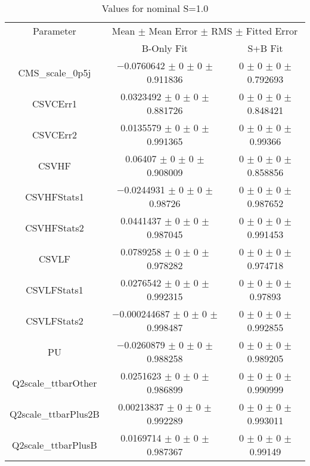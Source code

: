 \begin{table}
\centering
\caption{Values for nominal S=1.0}
\begin{tabular}{ccc}
\toprule
Parameter & \multicolumn{2}{c}{Mean $\pm$ Mean Error $\pm$ RMS $\pm$ Fitted Error}\\
 & B-Only Fit & S+B Fit\\
\midrule
CMS\_scale\_0p5j & \num{-0.0760642} $\pm$ \num{0} $\pm$ \num{0} $\pm$ \num{0.911836} & \num{0} $\pm$ \num{0} $\pm$ \num{0} $\pm$ \num{0.792693}\\
CSVCErr1 & \num{0.0323492} $\pm$ \num{0} $\pm$ \num{0} $\pm$ \num{0.881726} & \num{0} $\pm$ \num{0} $\pm$ \num{0} $\pm$ \num{0.848421}\\
CSVCErr2 & \num{0.0135579} $\pm$ \num{0} $\pm$ \num{0} $\pm$ \num{0.991365} & \num{0} $\pm$ \num{0} $\pm$ \num{0} $\pm$ \num{0.99366}\\
CSVHF & \num{0.06407} $\pm$ \num{0} $\pm$ \num{0} $\pm$ \num{0.908009} & \num{0} $\pm$ \num{0} $\pm$ \num{0} $\pm$ \num{0.858856}\\
CSVHFStats1 & \num{-0.0244931} $\pm$ \num{0} $\pm$ \num{0} $\pm$ \num{0.98726} & \num{0} $\pm$ \num{0} $\pm$ \num{0} $\pm$ \num{0.987652}\\
CSVHFStats2 & \num{0.0441437} $\pm$ \num{0} $\pm$ \num{0} $\pm$ \num{0.987045} & \num{0} $\pm$ \num{0} $\pm$ \num{0} $\pm$ \num{0.991453}\\
CSVLF & \num{0.0789258} $\pm$ \num{0} $\pm$ \num{0} $\pm$ \num{0.978282} & \num{0} $\pm$ \num{0} $\pm$ \num{0} $\pm$ \num{0.974718}\\
CSVLFStats1 & \num{0.0276542} $\pm$ \num{0} $\pm$ \num{0} $\pm$ \num{0.992315} & \num{0} $\pm$ \num{0} $\pm$ \num{0} $\pm$ \num{0.97893}\\
CSVLFStats2 & \num{-0.000244687} $\pm$ \num{0} $\pm$ \num{0} $\pm$ \num{0.998487} & \num{0} $\pm$ \num{0} $\pm$ \num{0} $\pm$ \num{0.992855}\\
PU & \num{-0.0260879} $\pm$ \num{0} $\pm$ \num{0} $\pm$ \num{0.988258} & \num{0} $\pm$ \num{0} $\pm$ \num{0} $\pm$ \num{0.989205}\\
Q2scale\_ttbarOther & \num{0.0251623} $\pm$ \num{0} $\pm$ \num{0} $\pm$ \num{0.986899} & \num{0} $\pm$ \num{0} $\pm$ \num{0} $\pm$ \num{0.990999}\\
Q2scale\_ttbarPlus2B & \num{0.00213837} $\pm$ \num{0} $\pm$ \num{0} $\pm$ \num{0.992289} & \num{0} $\pm$ \num{0} $\pm$ \num{0} $\pm$ \num{0.993011}\\
Q2scale\_ttbarPlusB & \num{0.0169714} $\pm$ \num{0} $\pm$ \num{0} $\pm$ \num{0.987367} & \num{0} $\pm$ \num{0} $\pm$ \num{0} $\pm$ \num{0.99149}\\

\end{tabular}
\end{table}
